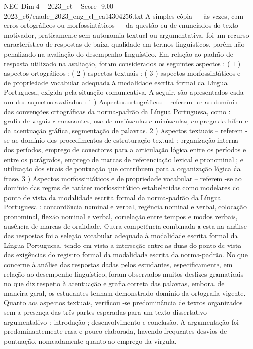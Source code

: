 \begin{textsample}{NEG Dim 4 – 2023\_c6 – Score -9.00 – 2023\_c6/enade\_2023\_eng\_el\_ca14304256.txt}
A simples cópia — às vezes, com erros ortográficos ou morfossintáticos — da questão ou de enunciados do texto motivador, praticamente sem autonomia textual ou argumentativa, foi um recurso característico de respostas de baixa qualidade em termos linguísticos, porém não penalizado na avaliação do desempenho linguístico.
Em relação ao padrão de resposta utilizado na avaliação, foram considerados os seguintes aspectos : ( 1 ) aspectos ortográficos ; ( 2 ) aspectos textuais ; ( 3 ) aspectos morfossintáticos e de propriedade vocabular adequada à modalidade escrita formal da Língua Portuguesa, exigida pela situação comunicativa.
A seguir, são apresentados cada um dos aspectos avaliados : 1 ) Aspectos ortográficos – referem -se ao domínio das convenções ortográficas da norma-padrão da Língua Portuguesa, como : grafia de vogais e consoantes, uso de maiúsculas e minúsculas, emprego do hífen e da acentuação gráfica, segmentação de palavras. 2 ) Aspectos textuais – referem -se ao domínio dos procedimentos de estruturação textual : organização interna dos períodos, emprego de conectores para a articulação lógica entre os períodos e entre os parágrafos, emprego de marcas de referenciação lexical e pronominal ; e utilização dos sinais de pontuação que contribuem para a organização lógica da frase. 3 ) Aspectos morfossintáticos e de propriedade vocabular – referem -se ao domínio das regras de caráter morfossintático estabelecidas como modelares do ponto de vista da modalidade escrita formal da norma-padrão da Língua Portuguesa : concordância nominal e verbal, regência nominal e verbal, colocação pronominal, flexão nominal e verbal, correlação entre tempos e modos verbais, ausência de marcas de oralidade.
Outra competência combinada a esta na análise das respostas foi a seleção vocabular adequada à modalidade escrita formal da Língua Portuguesa, tendo em vista a interseção entre as duas do ponto de vista das exigências do registro formal da modalidade escrita da norma-padrão.
No que concerne à análise das respostas dadas pelos estudantes, especificamente, em relação ao desempenho linguístico, foram observados muitos deslizes gramaticais no que diz respeito à acentuação e grafia correta das palavras, embora, de maneira geral, os estudantes tenham demonstrado domínio da ortografia vigente.
Quanto aos aspectos textuais, verificou -se predominância de textos organizados sem a presença das três partes esperadas para um texto dissertativo-argumentativo : introdução ; desenvolvimento e conclusão.
A argumentação foi predominantemente rasa e pouco elaborada, havendo frequentes desvios de pontuação, nomeadamente quanto ao emprego da vírgula.

\end{textsample}
